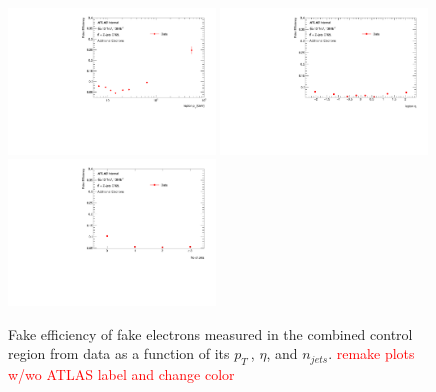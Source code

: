 \begin{figure}[htb]
		\begin{center}
		\includegraphics[width = 0.49\textwidth]{figures/Analysis/Background/Fake_Eff_Elec_pt_1D.pdf}
		\includegraphics[width = 0.49\textwidth]{figures/Analysis/Background/Fake_Eff_Elec_eta_1D.pdf}\\
		\includegraphics[width = 0.49\textwidth]{figures/Analysis/Background/Fake_Eff_Elec_jet_n_1D.pdf} 
		\end{center}
	\caption{Fake efficiency of fake electrons measured in the combined control region from data as a function of its $p_{T}~$, $\eta$, and $n_{jets}$. \textcolor{red}{remake plots w/wo ATLAS label and change color} \label{fig:FakeEff_1D_Electron}}
\end{figure}

